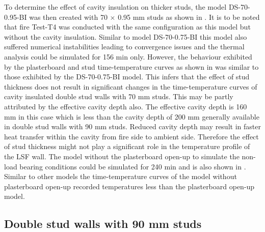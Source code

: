 To determine the effect of cavity insulation on thicker studs, the model DS-70-0.95-BI was then created with 70 $\times$ 0.95 mm studs as shown in . It is to be noted that fire Test-T4 was conducted with the same configuration as this model but without the cavity insulation. 
Similar to model DS-70-0.75-BI this model also suffered numerical instabilities leading to convergence issues and the thermal analysis could be simulated for 156 min only. However, the behaviour exhibited by the plasterboard and stud time-temperature curves as shown in  was similar to those exhibited by the DS-70-0.75-BI model. This infers that the effect of stud thickness does not result in significant changes in the time-temperature curves of cavity insulated double stud walls with 70 mm studs. This may be partly attributed by the effective cavity depth also. The effective cavity depth is 160 mm in this case which is less than the cavity depth of 200 mm generally available in double stud walls with 90 mm studs. Reduced cavity depth may result in faster heat transfer within the cavity from fire side to ambient side. Therefore the effect of stud thickness might not play a significant role in the temperature profile of the LSF wall. The model without the plasterboard open-up to simulate the non-load bearing conditions could be simulated for 240 min and is also shown in . Similar to other models the time-temperature curves of the model without plasterboard open-up recorded temperatures less than the plasterboard open-up model.

\subsection{Double stud walls with 90 mm studs}

